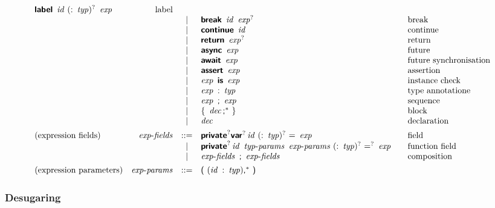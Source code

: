 $$\begin{array}{@{}lrcl@{\qquad}l}
  \KK{label}~\x{id}~(\K:~\x{typ})^?~\x{exp}
    & \text{label} \\&&|&
  \KK{break}~\x{id}~\x{exp}^?
    & \text{break} \\&&|&
  \KK{continue}~\x{id}
    & \text{continue} \\&&|&
  \KK{return}~\x{exp}^?
    & \text{return} \\&&|&
  \KK{async}~\x{exp}
    & \text{future} \\&&|&
  \KK{await}~\x{exp}
    & \text{future synchronisation} \\&&|&
  \KK{assert}~\x{exp}
    & \text{assertion} \\&&|&
  \x{exp}~\KK{is}~\x{exp}
    & \text{instance check} \\&&|&
  \x{exp}~\K:~\x{typ}
    & \text{type annotatione} \\&&|&
  \x{exp}~\K;~\x{exp}
    & \text{sequence} \\&&|&
  \K\{~\x{dec}\K;^\ast~\K\}
    & \text{block} \\&&|&
  \x{dec}
    & \text{declaration} \\
[1ex]
\text{(expression fields)} & \x{exp-fields} &::=&
  \KK{private}^? \KK{var}^? \x{id}~(\K:~\x{typ})^?~\K=~\x{exp}
    & \text{field} \\&&|&
  \KK{private}^? \x{id}~\x{typ-params}~\x{exp-params}~(\K:~\x{typ})^?~\K=^?~\x{exp}
    & \text{function field} \\&&|&
  \x{exp-fields}~\K;~\x{exp-fields}
    & \text{composition} \\
[1ex]
\text{(expression parameters)} & \x{exp-params} &::=&
  \K(~(\x{id}~\K:~\x{typ})\K,^\ast~\K) \\
\end{array}
$$

\subsubsection*{Desugaring}

